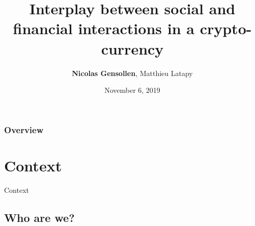 \documentclass{beamer}
\title[social and financial interactions]{Interplay between social and financial interactions in a crypto-currency } %
\author{\textbf{Nicolas Gensollen}, Matthieu Latapy} %
\institute[LIP6] %
{
Laboratoire d'informatique de Paris 6 \\ %
\medskip
\textit{nicolas.gensollen@lip6.fr \\
\bigskip
MARAMI 2019 - Dijon - France} %
}
\date{November 6, 2019} %
\begin{document}
\begin{frame}
\titlepage %
\end{frame}

\begin{frame}
\frametitle{Overview} %
\tableofcontents %
\end{frame}



\section{Context} 

\begin{frame}
\Huge{\centerline{Context}}
\end{frame}


\subsection{Who are we?}
\end{document}
